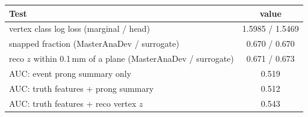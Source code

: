 \begin{tabular}{lc}
\toprule
Test & value \\
\midrule
vertex class log loss (marginal / head) & 1.5985 / 1.5469 \\
snapped fraction (MasterAnaDev / surrogate) & 0.670 / 0.670 \\
reco $z$ within 0.1\,mm of a plane (MasterAnaDev / surrogate) & 0.671 / 0.673 \\
\midrule
AUC: event prong summary only & 0.519 \\
AUC: truth features + prong summary & 0.512 \\
AUC: truth features + reco vertex $z$ & 0.543 \\
\bottomrule
\end{tabular}
